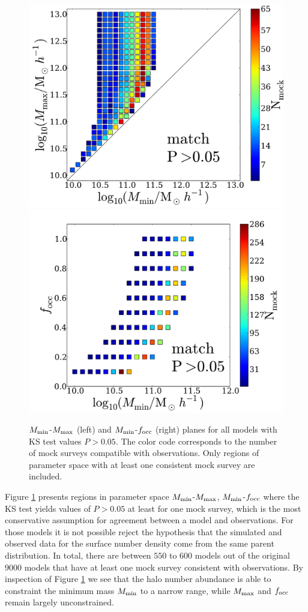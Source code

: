 \documentclass[usenatbib]{mn2e}
\begin{document}
\begin{figure}
\begin{center}
\includegraphics[width=0.46\linewidth,angle=0]{Fig2_match_P5.pdf}
\vspace{5mm}
\includegraphics[width=0.49\linewidth,angle=0]{Fig3_match_P5.pdf}
\end{center} 
\caption{$M_{\rm min}$-$M_{\rm max}$ (left) and $M_{\rm    min}$-$f_{\rm
    occ}$ (right) planes for all models with  KS test values
  $P>0.05$. The color code corresponds to the number of mock surveys
  compatible with observations. Only regions of parameter  space with
  at least one consistent mock survey are  included. \label{fig:landscape}}     
\end{figure}


Figure \ref{fig:landscape} presents regions in parameter space $M_{\rm
min}$-$M_{\rm max}$, $M_{\rm min}$-$f_{\rm occ}$ where the KS test yields
values of $P>0.05$ at least for one mock survey, which is the most
conservative assumption for agreement between a model and observations. For those models it
is not possible reject the hypothesis that the simulated and observed
data for the surface number density come from the same parent
distribution. In total, there are between $550$ to $600$ models out of
the original $9000$ models that have at least one mock survey
consistent with observations. By inspection of Figure
\ref{fig:landscape} we see that the halo number abundance is able to
constraint the minimum mass $M_{\rm min}$ to a narrow range, while
$M_{\rm max}$ and $f_{\rm occ}$ remain largely unconstrained.
\end{document}
